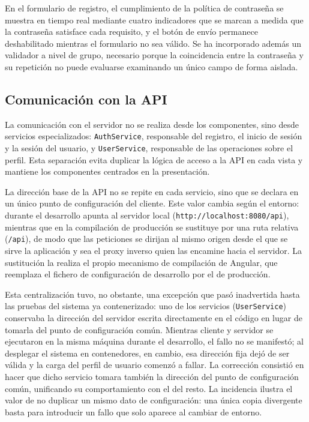 \documentclass[12pt,a4paper,twoside,openright]{book}
\begin{document}
    En el formulario de registro, el cumplimiento de la política de contraseña
    se muestra en tiempo real mediante cuatro indicadores que se marcan a medida
    que la contraseña satisface cada requisito, y el botón de envío permanece
    deshabilitado mientras el formulario no sea válido. Se ha incorporado
    además un validador a nivel de grupo, necesario porque la coincidencia entre
    la contraseña y su repetición no puede evaluarse examinando un único campo
    de forma aislada.

    \subsection{Comunicación con la API}

    La comunicación con el servidor no se realiza desde los componentes, sino
    desde servicios especializados: \texttt{AuthService}, responsable del
    registro, el inicio de sesión y la sesión del usuario, y
    \texttt{UserService}, responsable de las operaciones sobre el perfil. Esta
    separación evita duplicar la lógica de acceso a la API en cada vista y
    mantiene los componentes centrados en la presentación.

    La dirección base de la API no se repite en cada servicio, sino que se
    declara en un único punto de configuración del cliente. Este valor cambia
    según el entorno: durante el desarrollo apunta al servidor local
    (\texttt{http://localhost:8080/api}), mientras que en la compilación de
    producción se sustituye por una ruta relativa (\texttt{/api}), de modo que
    las peticiones se dirijan al mismo origen desde el que se sirve la
    aplicación y sea el proxy inverso quien las encamine hacia el servidor. La
    sustitución la realiza el propio mecanismo de compilación de Angular, que
    reemplaza el fichero de configuración de desarrollo por el de producción.

    Esta centralización tuvo, no obstante, una excepción que pasó inadvertida
    hasta las pruebas del sistema ya contenerizado: uno de los servicios
    (\texttt{UserService}) conservaba la dirección del servidor escrita
    directamente en el código en lugar de tomarla del punto de configuración
    común. Mientras cliente y servidor se ejecutaron en la misma máquina durante
    el desarrollo, el fallo no se manifestó; al desplegar el sistema en
    contenedores, en cambio, esa dirección fija dejó de ser válida y la carga del
    perfil de usuario comenzó a fallar. La corrección consistió en hacer que
    dicho servicio tomara también la dirección del punto de configuración común,
    unificando su comportamiento con el del resto. La incidencia ilustra el valor
    de no duplicar un mismo dato de configuración: una única copia divergente
    basta para introducir un fallo que solo aparece al cambiar de entorno.
\end{document}
